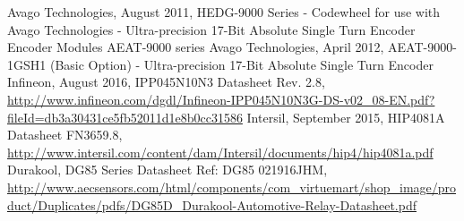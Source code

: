 \begin{thebibliography}{21} %
	Avago Technologies, August 2011, HEDG-9000 Series - Codewheel for use with Avago Technologies - Ultra-precision 17-Bit Absolute Single Turn Encoder
Encoder Modules AEAT-9000 series
	Avago Technologies, April 2012, AEAT-9000-1GSH1 (Basic Option) - Ultra-precision 17-Bit Absolute Single Turn Encoder
	Infineon, August 2016, IPP045N10N3 Datasheet Rev. 2.8, \url{http://www.infineon.com/dgdl/Infineon-IPP045N10N3G-DS-v02_08-EN.pdf?fileId=db3a30431ce5fb52011d1e8b0cc31586}
	Intersil, September 2015, HIP4081A Datasheet FN3659.8, \url{http://www.intersil.com/content/dam/Intersil/documents/hip4/hip4081a.pdf}
	Durakool, DG85 Series Datasheet Ref: DG85 021916JHM, \url{http://www.aecsensors.com/html/components/com_virtuemart/shop_image/product/Duplicates/pdfs/DG85D_Durakool-Automotive-Relay-Datasheet.pdf}
\end{thebibliography}